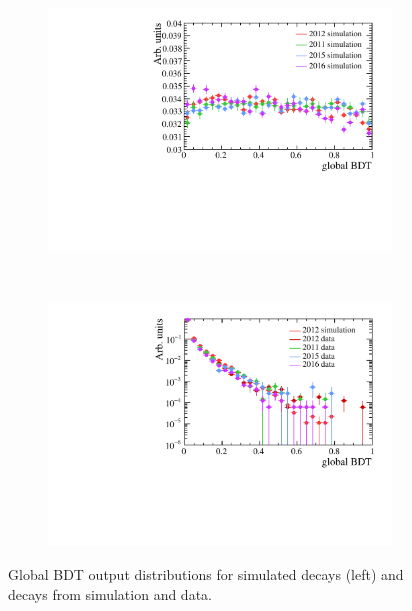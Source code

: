 \begin{figure}
    \centering
    \begin{subfigure}[b]{0.48\textwidth}
        \includegraphics[width=\textwidth]{./Figs/Selection/BDTflat_signal.pdf}
        \caption{ }
        \label{fig:BDTsig}
    \end{subfigure}
    ~ %
    \begin{subfigure}[b]{0.48\textwidth}
       \includegraphics[width=\textwidth]{./Figs/Selection/BDTflat_bkgnd.pdf}
        \caption{ }
        \label{fig:BDTbkg}
    \end{subfigure}
    \caption{Global BDT output distributions for \bsmumu simulated decays (left) and \bbbarmumux decays from simulation and data.}
    \label{fig:FlatteningBDT}
\end{figure}


